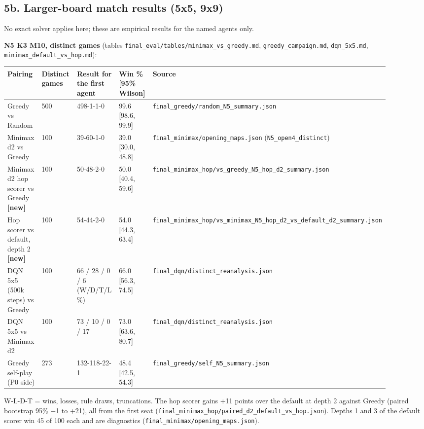 \documentclass[11pt]{article}
\begin{document}
\subsection{5b. Larger-board match results (5x5, 9x9)}

No exact solver applies here; these are empirical results for the named agents only.

\textbf{N5 K3 M10, distinct games} (tables \texttt{final\_eval/tables/minimax\_vs\_greedy.md},
\texttt{greedy\_campaign.md}, \texttt{dqn\_5x5.md}, \texttt{minimax\_default\_vs\_hop.md}):

\begin{center}\scriptsize
\begin{longtable}{p{0.18\linewidth}p{0.18\linewidth}p{0.18\linewidth}p{0.18\linewidth}p{0.18\linewidth}}
\toprule
Pairing & Distinct games & Result for the first agent & Win \% [95\% Wilson] & Source \\
\midrule
Greedy vs Random & 500 & 498-1-1-0 & 99.6 [98.6, 99.9] & \texttt{final\_greedy/random\_N5\_summary.json} \\
Minimax d2 vs Greedy & 100 & 39-60-1-0 & 39.0 [30.0, 48.8] & \texttt{final\_minimax/opening\_maps.json} (\texttt{N5\_open4\_distinct}) \\
Minimax d2 hop scorer vs Greedy \textbf{[new]} & 100 & 50-48-2-0 & 50.0 [40.4, 59.6] & \texttt{final\_minimax\_hop/vs\_greedy\_N5\_hop\_d2\_summary.json} \\
Hop scorer vs default, depth 2 \textbf{[new]} & 100 & 54-44-2-0 & 54.0 [44.3, 63.4] & \texttt{final\_minimax\_hop/vs\_minimax\_N5\_hop\_d2\_vs\_default\_d2\_summary.json} \\
DQN 5x5 (500k steps) vs Greedy & 100 & 66 / 28 / 0 / 6 (W/D/T/L \%) & 66.0 [56.3, 74.5] & \texttt{final\_dqn/distinct\_reanalysis.json} \\
DQN 5x5 vs Minimax d2 & 100 & 73 / 10 / 0 / 17 & 73.0 [63.6, 80.7] & \texttt{final\_dqn/distinct\_reanalysis.json} \\
Greedy self-play (P0 side) & 273 & 132-118-22-1 & 48.4 [42.5, 54.3] & \texttt{final\_greedy/self\_N5\_summary.json} \\
\bottomrule
\end{longtable}
\end{center}

W-L-D-T = wins, losses, rule draws, truncations. The hop scorer gains +11 points over the default
at depth 2 against Greedy (paired bootstrap 95\% +1 to +21), all from the first seat
(\texttt{final\_minimax\_hop/paired\_d2\_default\_vs\_hop.json}). Depths 1 and 3 of the default scorer win
45 of 100 each and are diagnostics (\texttt{final\_minimax/opening\_maps.json}).
\end{document}

